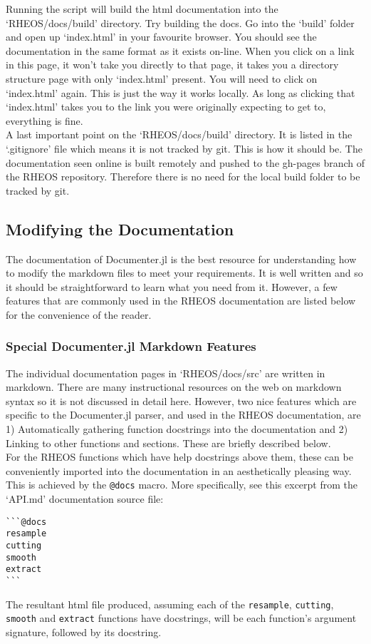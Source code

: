 \documentclass[]{article}
\newcommand{\cod}[1]{\colorbox{light-gray}{\texttt{#1}}}
\begin{document}
Running the script will build the html documentation into the `RHEOS/docs/build' directory. Try building the docs. Go into the `build' folder and open up `index.html' in your favourite browser. You should see the documentation in the same format as it exists on-line. When you click on a link in this page, it won't take you directly to that page, it takes you a directory structure page with only `index.html' present. You will need to click on `index.html' again. This is just the way it works locally. As long as clicking that `index.html' takes you to the link you were originally expecting to get to, everything is fine.\\

A last important point on the `RHEOS/docs/build' directory. It is listed in the `.gitignore' file which means it is not tracked by git. This is how it should be. The documentation seen online is built remotely and pushed to the gh-pages branch of the RHEOS repository. Therefore there is no need for the local build folder to be tracked by git.

\subsection{Modifying the Documentation}
The documentation of Documenter.jl is the best resource for understanding how to modify the markdown files to meet your requirements. It is well written and so it should be straightforward to learn what you need from it. However, a few features that are commonly used in the RHEOS documentation are listed below for the convenience of the reader.
\subsubsection{Special Documenter.jl Markdown Features}
The individual documentation pages in `RHEOS/docs/src' are written in markdown. There are many instructional resources on the web on markdown syntax so it is not discussed in detail here. However, two nice features which are specific to the Documenter.jl parser, and used in the RHEOS documentation, are 1) Automatically gathering function docstrings into the documentation and 2) Linking to other functions and sections. These are briefly described below.\\

For the RHEOS functions which have help docstrings above them, these can be conveniently imported into the documentation in an aesthetically pleasing way. This is achieved by the \cod{@docs} macro. More specifically, see this excerpt from the `API.md' documentation source file:
\begin{verbatim}
```@docs
resample
cutting
smooth
extract
```
\end{verbatim}
The resultant html file produced, assuming each of the \cod{resample}, \cod{cutting}, \cod{smooth} and \cod{extract} functions have docstrings, will be each function's argument signature, followed by its docstring.\\
\end{document}
